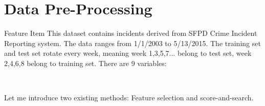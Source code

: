 \documentclass[
 size=14pt,
 paper=smartboard,  %
 mode=present, 		%
 display=slides, 	%
 style=tuliplab,  	%
 pauseslide,
 fleqn,leqno]{powerdot}
\begin{document}


\section{Data Pre-Processing}


\begin{slide}{Feature Item}
This dataset contains incidents derived from 
SFPD Crime Incident Reporting system. The data 
ranges from 1/1/2003 to 5/13/2015. The training 
set and test set rotate every week, meaning 
week 1,3,5,7... belong to test set, week 2,4,6,8 
belong to training set. There are 9 variables:


\bigskip
~\\




\begin{note}
Let me introduce two existing methods:
Feature selection and score-and-search.


\end{note}
\end{slide}
\end{document}
